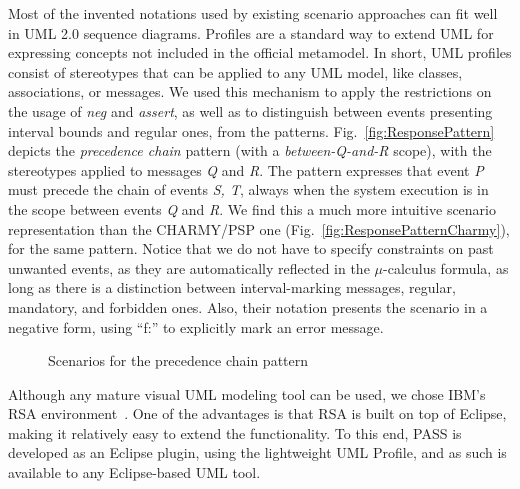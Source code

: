 \documentclass[letter]{llncs}
\begin{document}
Most of the invented notations used by existing scenario approaches can fit well in UML 2.0 sequence diagrams.
Profiles are a standard way to extend UML for expressing concepts not included in the official metamodel. 
In short, UML profiles consist of stereotypes that can be applied to any UML model, like classes,
associations, or messages. We used this mechanism 
to apply the restrictions on the usage of \emph{neg} and \emph{assert},
as well as to distinguish between events presenting interval bounds and regular ones, from the patterns.
Fig.~\ref{fig:ResponsePattern} depicts the \emph{precedence chain} pattern (with
a \emph{between-Q-and-R} scope), with the stereotypes applied to messages
\emph{Q} and \emph{R}.
The pattern expresses that event \emph{P} must precede the chain of events
\emph{S, T}, always when the system execution is in the scope between events
\emph{Q} and \emph{R}.
We find this a much more intuitive scenario representation than the CHARMY/PSP
one (Fig.~\ref{fig:ResponsePatternCharmy}), for the same pattern.
Notice that we do not have to specify constraints on past unwanted events, as they are automatically
reflected in the $\mu$-calculus formula, as long as there is a distinction between interval-marking messages,
regular, mandatory, and forbidden ones. Also, their notation presents the scenario in a negative form, using ``f:'' to
explicitly mark an error message. 
\begin{figure}[t!]
  \centering
  \hfill
  \caption{Scenarios for the precedence chain pattern}
\end{figure}
Although any mature visual UML modeling tool 
can be used, we chose IBM's RSA environment~\cite{terry2006visual}.
One of the advantages is that RSA is built on top of Eclipse, making 
it relatively easy to extend the functionality. To this end, PASS is developed as an Eclipse plugin, using the 
lightweight UML Profile, and as such is available to any Eclipse-based UML tool.
\end{document}
